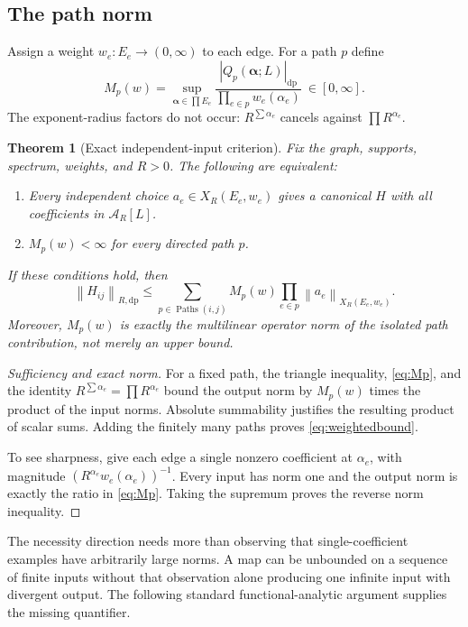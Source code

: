 \documentclass[11pt,a4paper]{article}
\numberwithin{equation}{section}
\newtheorem{theorem}{Theorem}[section]
\theoremstyle{definition}
\theoremstyle{remark}
\newcommand{\A}{\mathcal A}
\newcommand{\Paths}{\operatorname{Paths}}
\newcommand{\norm}[1]{\left\|#1\right\|}
\begin{document}
\subsection{The path norm}
Assign a weight $w_e:E_e\to(0,\infty)$ to each edge. For a path $p$ define
\begin{equation}\label{eq:Mp}
 M_p(w)=\sup_{\boldsymbol\alpha\in\prod E_e}
 \frac{|Q_p(\boldsymbol\alpha;L)|_{\mathrm{dp}}}
      {\prod_{e\in p}w_e(\alpha_e)}\ \in[0,\infty].
\end{equation}
The exponent-radius factors do not occur: $R^{\sum\alpha_e}$ cancels
against $\prod R^{\alpha_e}$.

\begin{theorem}[Exact independent-input criterion]\label{thm:weighted}
Fix the graph, supports, spectrum, weights, and $R>0$. The following are
equivalent:
\begin{enumerate}[label=(\roman*)]
\item Every independent choice $a_e\in X_R(E_e,w_e)$ gives a canonical
      $H$ with all coefficients in $\A_R[L]$.
\item $M_p(w)<\infty$ for every directed path $p$.
\end{enumerate}
If these conditions hold, then
\begin{equation}\label{eq:weightedbound}
 \norm{H_{ij}}_{R,\mathrm{dp}}
 \leq\sum_{p\in\Paths(i,j)}M_p(w)
                \prod_{e\in p}\norm{a_e}_{X_R(E_e,w_e)}.
\end{equation}
Moreover, $M_p(w)$ is exactly the multilinear operator norm of the isolated
path contribution, not merely an upper bound.
\end{theorem}

\begin{proof}[Sufficiency and exact norm]
For a fixed path, the triangle inequality, \eqref{eq:Mp}, and the identity
$R^{\sum\alpha_e}=\prod R^{\alpha_e}$ bound the output norm by
$M_p(w)$ times the product of the input norms. Absolute summability
justifies the resulting product of scalar sums. Adding the finitely many
paths proves \eqref{eq:weightedbound}.

To see sharpness, give each edge a single nonzero coefficient at
$\alpha_e$, with magnitude $(R^{\alpha_e}w_e(\alpha_e))^{-1}$.
Every input has norm one and the output norm is exactly the ratio in
\eqref{eq:Mp}. Taking the supremum proves the reverse norm inequality.
\end{proof}

The necessity direction needs more than observing that single-coefficient
examples have arbitrarily large norms. A map can be unbounded on a sequence
of finite inputs without that observation alone producing one infinite
input with divergent output. The following standard functional-analytic
argument supplies the missing quantifier.
\end{document}
